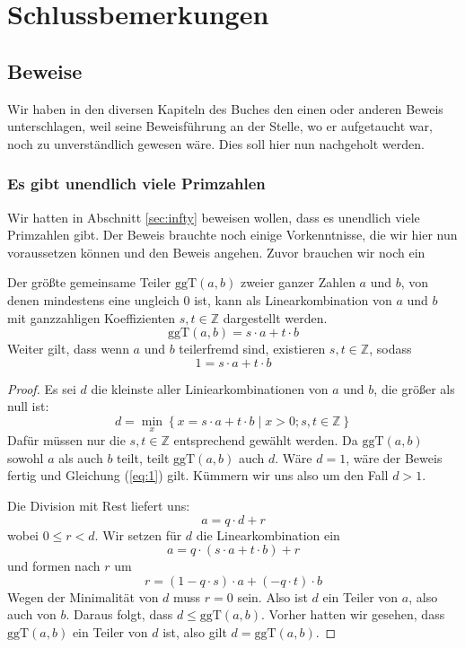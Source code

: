 
\chapter{Schlussbemerkungen}

\section{Beweise}

Wir haben in den diversen Kapiteln des Buches den einen oder anderen Beweis unterschlagen, weil seine Beweisführung an der Stelle, wo er aufgetaucht war, noch zu unverständlich gewesen wäre. Dies soll hier nun nachgeholt werden.


\subsection{Es gibt unendlich viele Primzahlen}\label{chap:proofprime}
Wir hatten in Abschnitt \ref{sec:infty} beweisen wollen, dass es unendlich viele Primzahlen gibt. Der Beweis brauchte noch einige Vorkenntnisse, die wir hier nun voraussetzen können und den Beweis angehen. Zuvor brauchen wir noch ein

\begin{lemma}
Der größte gemeinsame Teiler $\text{ggT}(a,b) $ zweier ganzer Zahlen $a$ und $b$, von denen mindestens eine ungleich 0 ist, kann als Linearkombination von $a$ und $b$ mit ganzzahligen Koeffizienten $s,t\in \mathbb{Z}$ dargestellt werden. 
\[
\text{ggT}(a,b) = s\cdot a+t\cdot b
\]
Weiter gilt, dass wenn $a$ und $b$ teilerfremd sind, existieren $s,t \in \mathbb{Z}$, sodass
\begin{equation}\label{eq:1}
1 = s\cdot a+t\cdot b
\end{equation}
\end{lemma}
\begin{proof}
Es sei $d$ die kleinste aller Liniearkombinationen von $a$ und $b$, die größer als null ist:
\[
d = \min_x \left\lbrace x = s\cdot a+t\cdot b \mid x>0; s,t\in \mathbb{Z} \right\rbrace
\]
Dafür müssen nur die $s,t\in \mathbb{Z}$ entsprechend gewählt werden. Da $\text{ggT}(a,b)$ sowohl $a$ als auch $b$ teilt, teilt $\text{ggT}(a,b)$ auch $d$. Wäre $d=1$, wäre der Beweis fertig und Gleichung (\ref{eq:1}) gilt. Kümmern wir uns also um den Fall $d>1$. 

Die Division mit Rest liefert uns:
\[
a = q\cdot d+r
\]
wobei $0\le r < d$. Wir setzen für $d$ die Linearkombination ein
\[
a = q\cdot(s\cdot a+t\cdot b)+r
\]
und formen nach $r$ um
\[
r = (1-q\cdot s)\cdot a+(-q\cdot t)\cdot b
\]
Wegen der Minimalität von $d$ muss $r=0$ sein. Also ist $d$ ein Teiler von $a$, also auch von $b$. Daraus folgt, dass $d\le \text{ggT}(a,b)$. Vorher hatten wir gesehen, dass $\text{ggT}(a,b)$ ein Teiler von $d$ ist, also gilt $d=\text{ggT}(a,b)$.
\end{proof}

